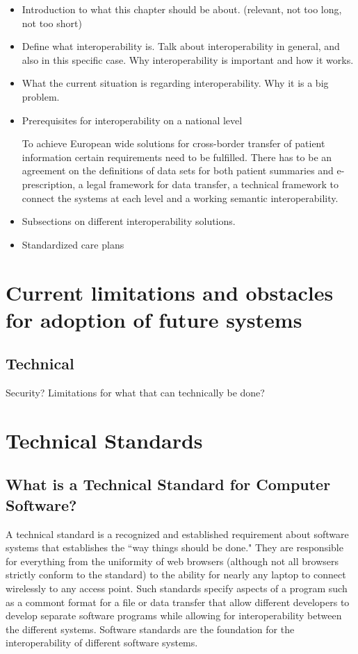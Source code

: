 \documentclass[12pt]{article}
\begin{document}
\begin{itemize}
\item Introduction to what this chapter should be about. (relevant, not too long, not too short)
\item Define what interoperability is. Talk about interoperability in general, and also in this specific case. Why interoperability is important and how it works.
\item What the current situation is regarding interoperability. Why it is a big problem.
\item Prerequisites for interoperability on a national level

To achieve European wide solutions for cross-border transfer of patient information certain requirements need to be fulfilled. There has to be an agreement on the definitions of data sets for both patient summaries and e-prescription, a legal framework for data transfer, a technical framework to connect the systems at each level and a working semantic interoperability. \cite{epSOS1}

\item Subsections on different interoperability solutions.
\item Standardized care plans
\end{itemize}


\section{Current limitations and obstacles for adoption of future systems}

\subsection{Technical}
Security? Limitations for what that can technically be done?


\newpage

\section{Technical Standards}


\subsection{What is a Technical Standard for Computer Software?}
A technical standard is a recognized and established requirement about software systems that establishes the ``way things should be done." They are responsible for everything from the uniformity of web browsers (although not all browsers strictly conform to the standard) to the ability for nearly any laptop to connect wirelessly to any access point. Such standards specify aspects of a program such as a commont format for a file or data transfer that allow different developers to develop separate software programs while allowing for interoperability between the different systems. Software standards are the foundation for the interoperability of different software systems.
\end{document}

